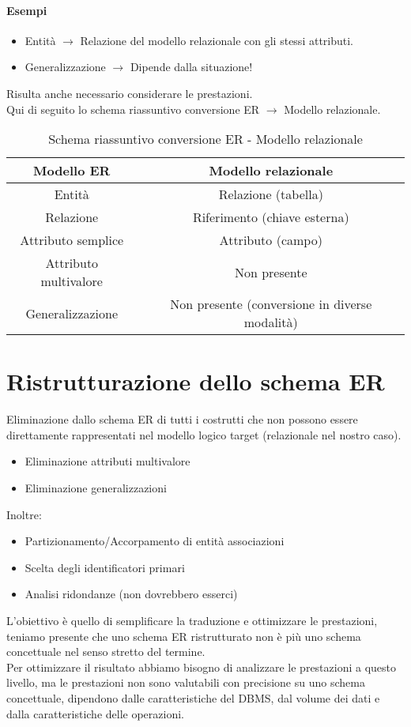 \paragraph*{Esempi} 
\begin{itemize}
    \item Entità $\rightarrow$ Relazione del modello relazionale con gli 
    stessi attributi.
    \item Generalizzazione $\rightarrow$ Dipende dalla situazione!
\end{itemize}
Risulta anche necessario considerare le prestazioni.\\
Qui di seguito lo schema riassuntivo conversione ER $\rightarrow$ Modello relazionale.\\
\begin{table}[h]
    \centering
    \vspace{10pt}
    \caption*{Schema riassuntivo conversione ER - Modello relazionale}
    \begin{tabular}{|c|c|}
        \hline
        \textbf{Modello ER} & \textbf{Modello relazionale}\\
        \hline
        Entità & Relazione (tabella)\\
        \hline
        Relazione & Riferimento (chiave esterna)\\
        \hline  
        Attributo semplice & Attributo (campo)\\
        \hline
        Attributo multivalore & Non presente\\
        \hline
        Generalizzazione & Non presente (conversione in diverse modalità)\\
        \hline
    \end{tabular}
\end{table}
\section{Ristrutturazione dello schema ER}
Eliminazione dallo schema ER di tutti i costrutti che non possono
essere direttamente rappresentati nel modello logico target (relazionale nel
nostro caso).
\begin{itemize}
    \item Eliminazione attributi multivalore
    \item Eliminazione generalizzazioni
\end{itemize}
Inoltre:
\begin{itemize}
    \item Partizionamento/Accorpamento di entità associazioni
    \item Scelta degli identificatori primari
    \item Analisi ridondanze (non dovrebbero esserci)
\end{itemize}
L'obiettivo è quello di semplificare la traduzione e ottimizzare le prestazioni,
teniamo presente che uno schema ER ristrutturato non è più uno schema concettuale nel senso stretto
del termine.\\
Per ottimizzare il risultato abbiamo bisogno di analizzare le prestazioni a questo livello, ma
le prestazioni non sono valutabili con precisione su uno schema concettuale, dipendono dalle
caratteristiche del DBMS, dal volume dei dati e dalla caratteristiche delle operazioni.\\
